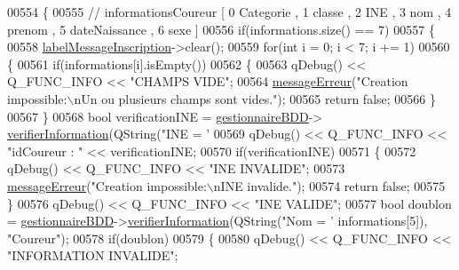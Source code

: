 \begin{DoxyCode}
00554 \{
00555     \textcolor{comment}{// informationsCoureur [ 0 Categorie , 1 classe , 2 INE , 3 nom , 4 prenom , 5 dateNaissance , 6 sexe ]}
00556     \textcolor{keywordflow}{if}(informations.size() == 7)
00557     \{
00558         \hyperlink{class_i_h_m_gestion_cross_a1855bd63290c39c20660064b41710e8c}{labelMessageInscription}->clear();
00559         \textcolor{keywordflow}{for}(\textcolor{keywordtype}{int} i = 0;  i < 7; i += 1)
00560         \{
00561             \textcolor{keywordflow}{if}(informations[i].isEmpty())
00562             \{
00563                 qDebug() << Q\_FUNC\_INFO << \textcolor{stringliteral}{"CHAMPS VIDE"};
00564                 \hyperlink{class_i_h_m_gestion_cross_a92fa6016b00d2d4429c901e77d37bf10}{messageErreur}(\textcolor{stringliteral}{"Creation impossible:\(\backslash\)nUn ou plusieurs champs sont vides."});
00565                 \textcolor{keywordflow}{return} \textcolor{keyword}{false};
00566             \}
00567         \}
00568         \textcolor{keywordtype}{bool} verificationINE = \hyperlink{class_i_h_m_gestion_cross_a440bac63a3e51db3e2c08e883f8cafc9}{gestionnaireBDD}->
      \hyperlink{class_gestion_b_d_d_abfd3cfb9553a83aafd86c3149869d6c0}{verifierInformation}(QString(\textcolor{stringliteral}{"INE = '%
00569         qDebug() << Q\_FUNC\_INFO << \textcolor{stringliteral}{"idCoureur : "} << verificationINE;
00570         \textcolor{keywordflow}{if}(verificationINE)
00571         \{
00572             qDebug() << Q\_FUNC\_INFO << \textcolor{stringliteral}{"INE INVALIDE"};
00573             \hyperlink{class_i_h_m_gestion_cross_a92fa6016b00d2d4429c901e77d37bf10}{messageErreur}(\textcolor{stringliteral}{"Creation impossible:\(\backslash\)nINE invalide."});
00574             \textcolor{keywordflow}{return} \textcolor{keyword}{false};
00575         \}
00576         qDebug() << Q\_FUNC\_INFO << \textcolor{stringliteral}{"INE VALIDE"};
00577         \textcolor{keywordtype}{bool} doublon = \hyperlink{class_i_h_m_gestion_cross_a440bac63a3e51db3e2c08e883f8cafc9}{gestionnaireBDD}->\hyperlink{class_gestion_b_d_d_abfd3cfb9553a83aafd86c3149869d6c0}{verifierInformation}(QString(\textcolor{stringliteral}{"Nom
       = '%
      informations[5]), \textcolor{stringliteral}{"Coureur"});
00578         \textcolor{keywordflow}{if}(doublon)
00579         \{
00580             qDebug() << Q\_FUNC\_INFO << \textcolor{stringliteral}{"INFORMATION INVALIDE"};
}}
\end{DoxyCode}
